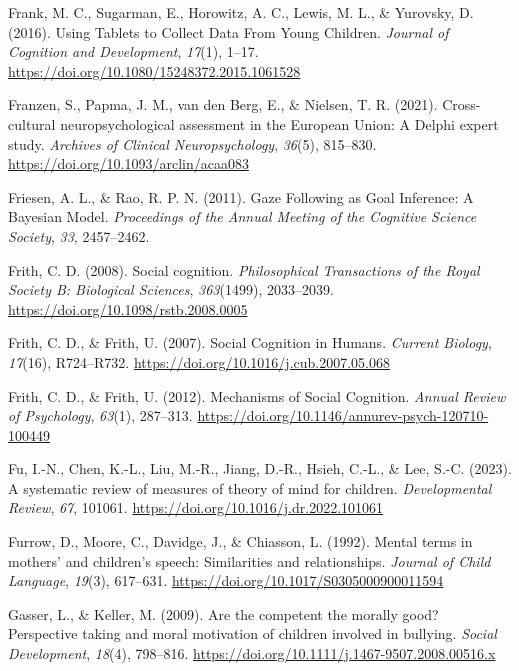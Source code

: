 \documentclass[
]{scrbook}
\newlength{\cslhangindent}
\newenvironment{CSLReferences}[2] %
 {\begin{list}{}{%
  \setlength{\itemindent}{0pt}
  \setlength{\leftmargin}{0pt}
  \setlength{\parsep}{0pt}
  \ifodd #1
   \setlength{\leftmargin}{\cslhangindent}
   \setlength{\itemindent}{-1\cslhangindent}
  \fi
  \setlength{\itemsep}{#2\baselineskip}}}
 {\end{list}}
\begin{document}
\begin{CSLReferences}{1}{0}
Frank, M. C., Sugarman, E., Horowitz, A. C., Lewis, M. L., \& Yurovsky, D. (2016). Using {Tablets} to {Collect Data From Young Children}. \emph{Journal of Cognition and Development}, \emph{17}(1), 1--17. \url{https://doi.org/10.1080/15248372.2015.1061528}

Franzen, S., Papma, J. M., van den Berg, E., \& Nielsen, T. R. (2021). Cross-cultural neuropsychological assessment in the {European Union}: A {Delphi} expert study. \emph{Archives of Clinical Neuropsychology}, \emph{36}(5), 815--830. \url{https://doi.org/10.1093/arclin/acaa083}

Friesen, A. L., \& Rao, R. P. N. (2011). Gaze {Following} as {Goal Inference}: {A Bayesian Model}. \emph{Proceedings of the Annual Meeting of the Cognitive Science Society}, \emph{33}, 2457--2462.

Frith, C. D. (2008). Social cognition. \emph{Philosophical Transactions of the Royal Society B: Biological Sciences}, \emph{363}(1499), 2033--2039. \url{https://doi.org/10.1098/rstb.2008.0005}

Frith, C. D., \& Frith, U. (2007). Social {Cognition} in {Humans}. \emph{Current Biology}, \emph{17}(16), R724--R732. \url{https://doi.org/10.1016/j.cub.2007.05.068}

Frith, C. D., \& Frith, U. (2012). Mechanisms of {Social Cognition}. \emph{Annual Review of Psychology}, \emph{63}(1), 287--313. \url{https://doi.org/10.1146/annurev-psych-120710-100449}

Fu, I.-N., Chen, K.-L., Liu, M.-R., Jiang, D.-R., Hsieh, C.-L., \& Lee, S.-C. (2023). A systematic review of measures of theory of mind for children. \emph{Developmental Review}, \emph{67}, 101061. \url{https://doi.org/10.1016/j.dr.2022.101061}

Furrow, D., Moore, C., Davidge, J., \& Chiasson, L. (1992). Mental terms in mothers' and children's speech: {Similarities} and relationships. \emph{Journal of Child Language}, \emph{19}(3), 617--631. \url{https://doi.org/10.1017/S0305000900011594}

Gasser, L., \& Keller, M. (2009). Are the competent the morally good? {Perspective} taking and moral motivation of children involved in bullying. \emph{Social Development}, \emph{18}(4), 798--816. \url{https://doi.org/10.1111/j.1467-9507.2008.00516.x}


\end{CSLReferences}
\end{document}
